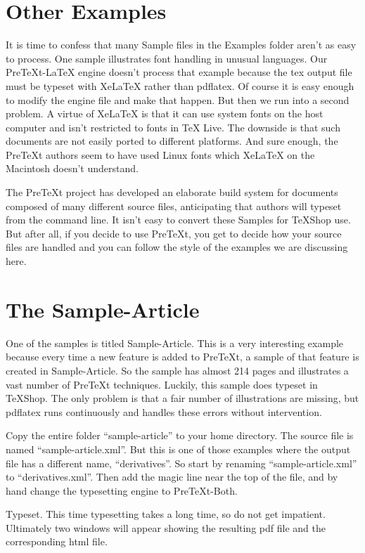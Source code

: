 \documentclass[11pt, oneside]{article}   	%
\begin{document}
\section{Other Examples}

It is time to confess that many Sample files in the Examples folder aren't as easy to process. One sample illustrates font handling in unusual languages. Our PreTeXt-LaTeX engine doesn't process that example because the tex output file must be typeset with XeLaTeX rather than pdflatex. Of course it is easy enough to modify the engine file and make that happen. But then we run into a second problem. A  virtue of XeLaTeX is that it can use system fonts on the host computer and isn't restricted to fonts in TeX Live. The downside is that such documents are not easily ported to different platforms. And sure enough, the PreTeXt authors seem to have used Linux fonts which XeLaTeX on the Macintosh doesn't understand.

The PreTeXt project has developed an elaborate build system for documents composed of many different source files, anticipating that authors will typeset from the command line. It isn't  easy to convert these Samples for TeXShop use. But after all, if you decide to use PreTeXt, you get to decide how your source files are handled and you can follow the style of the examples we are discussing here. 

\section{The Sample-Article}

One of the samples is titled Sample-Article. This is a very interesting example because every time a new feature is added to PreTeXt, a sample of that feature is created in Sample-Article. So the sample has almost 214 pages and illustrates a vast number of PreTeXt techniques. Luckily, this sample does typeset in TeXShop. The only problem is that a fair number of illustrations are missing, but pdflatex runs continuously and handles these errors without intervention. 

Copy the entire folder ``sample-article'' to your home directory. The source file is named ``sample-article.xml''. But this is one of those examples where the output file has a different name, ``derivatives''. So start by renaming ``sample-article.xml'' to ``derivatives.xml''.
Then add the magic line near the top of the file, and by hand change the typesetting engine to PreTeXt-Both.

Typeset. This time typesetting takes a long time, so do not get impatient. Ultimately two windows will appear showing the resulting pdf file and the corresponding html file.
\end{document}
